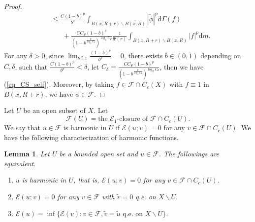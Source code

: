 \documentclass[11pt,a4paper]{article}
\numberwithin{equation}{section}
\theoremstyle{plain}
\newtheorem{lemma}[theorem]{Lemma}
\theoremstyle{definition}
\begin{document}
\begin{proof}
\begin{align*}
&\le\frac{C(1-b)^p}{b^{p}}\int_{B(x,R+r)\backslash\overline{B(x,R)}}|\widetilde{\phi}|^p\mathrm{d}\Gamma(f)\\
&\hspace{20pt}+\frac{CC_\Psi(1-b)^p}{(1-b^{\frac{p}{\log_2C_\Psi}})^{\log_2C_\Psi}}\frac{1}{\Psi(r)}\int_{B(x,R+r)\backslash\overline{B(x,R)}}|f|^p\mathrm{d} m.
\end{align*}
For any $\delta>0$, since $\lim_{b\uparrow1}\frac{(1-b)^p}{b^{p}}=0$, there exists $b\in(0,1)$ depending on $C, \delta$, such that $\frac{C(1-b)^p}{b^{p}}<\delta$, let $C_\delta=\frac{CC_\Psi(1-b)^p}{(1-b^{\frac{p}{\log_2C_\Psi}})^{\log_2C_\Psi}}$, then we have (\ref{eq_CS_self}). Moreover, by taking $f\in\mathcal{F}\cap C_c(X)$ with $f\equiv1$ in $B(x,R+r)$, we have $\phi\in\mathcal{F}$.
\end{proof}

Let $U$ be an open subset of $X$. Let
$$\mathcal{F}(U)=\text{the }\mathcal{E}_1\text{-closure of }\mathcal{F}\cap C_c(U).$$
We say that $u\in\mathcal{F}$ is harmonic in $U$ if $\mathcal{E}(u;v)=0$ for any $v\in\mathcal{F}\cap C_c(U)$. We have the following characterization of harmonic functions.

\begin{lemma}\label{lem_harm_equiv}
Let $U$ be a bounded open set and $u\in\mathcal{F}$. The followings are equivalent.
\begin{enumerate}[label=(\arabic*)]
\item $u$ is harmonic in $U$, that is, $\mathcal{E}(u;v)=0$ for any $v\in\mathcal{F}\cap C_c(U)$.
\item $\mathcal{E}(u;v)=0$ for any $v\in\mathcal{F}$ with $\widetilde{v}=0$ q.e. on $X\backslash U$.
\item $\mathcal{E}(u)=\inf\{\mathcal{E}(v):v\in\mathcal{F},\widetilde{v}=\widetilde{u}\text{ q.e. on }X\backslash U\}$.
\end{enumerate}
\end{lemma}
\end{document}
